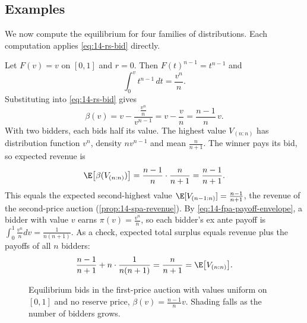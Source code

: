 \subsection{Examples}\label{sec:14-fpa-examples}

We now compute the equilibrium for four families of distributions. Each computation applies \eqref{eq:14-rs-bid} directly.

\begin{example}\label{ex:14-uniform}
Let $F(v)=v$ on $[0,1]$ and $r=0$. Then $F(t)^{n-1}=t^{n-1}$ and
\[
\int_0^v t^{n-1}\,dt=\frac{v^n}{n}.
\]
Substituting into \eqref{eq:14-rs-bid} gives
\[
\beta(v)=v-\frac{\frac{v^n}{n}}{v^{n-1}}=v-\frac{v}{n}=\frac{n-1}{n}\,v.
\]
With two bidders, each bids half its value. The highest value $V_{(n:n)}$ has distribution function $v^n$, density $nv^{n-1}$ and mean $\frac{n}{n+1}$. The winner pays its bid, so expected revenue is
\[
\E\big[\beta(V_{(n:n)})\big]=\frac{n-1}{n}\cdot\frac{n}{n+1}=\frac{n-1}{n+1}.
\]
This equals the expected second-highest value $\E[V_{(n-1:n)}]=\frac{n-1}{n+1}$, the revenue of the second-price auction (\cref{prop:14-spa-revenue}). By \eqref{eq:14-fpa-payoff-envelope}, a bidder with value $v$ earns $\pi(v)=\frac{v^n}{n}$, so each bidder's ex ante payoff is $\int_0^1\frac{v^n}{n}dv=\frac{1}{n(n+1)}$. As a check, expected total surplus equals revenue plus the payoffs of all $n$ bidders:
\[
\frac{n-1}{n+1}+n\cdot\frac{1}{n(n+1)}=\frac{n}{n+1}=\E\big[V_{(n:n)}\big].
\]
\end{example}

\begin{figure}[htbp]
\centering
{}
\caption{Equilibrium bids in the first-price auction with values uniform on $[0,1]$ and no reserve price, $\beta(v)=\frac{n-1}{n}v$. Shading falls as the number of bidders grows.}\label{fig:14-rs-uniform}
\end{figure}

